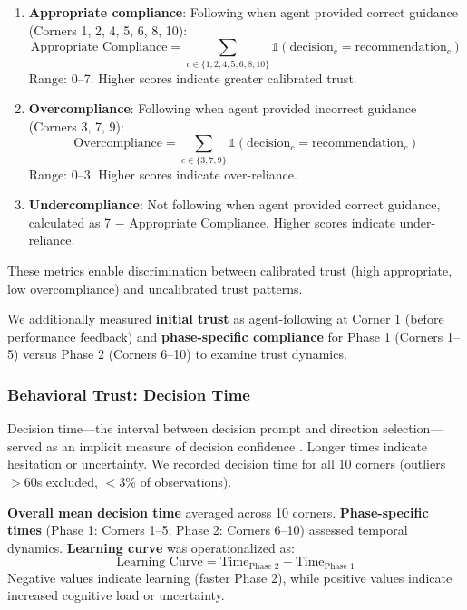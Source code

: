 \documentclass[12pt]{article}
\begin{document}
\begin{enumerate}
\item \textbf{Appropriate compliance}: Following when agent provided correct guidance (Corners 1, 2, 4, 5, 6, 8, 10):
\begin{equation}
\text{Appropriate Compliance} = \sum_{c \in \{1,2,4,5,6,8,10\}} \mathbb{1}(\text{decision}_c = \text{recommendation}_c)
\end{equation}
Range: 0--7. Higher scores indicate greater calibrated trust.

\item \textbf{Overcompliance}: Following when agent provided incorrect guidance (Corners 3, 7, 9):
\begin{equation}
\text{Overcompliance} = \sum_{c \in \{3,7,9\}} \mathbb{1}(\text{decision}_c = \text{recommendation}_c)
\end{equation}
Range: 0--3. Higher scores indicate over-reliance.

\item \textbf{Undercompliance}: Not following when agent provided correct guidance, calculated as 7 $-$ Appropriate Compliance. Higher scores indicate under-reliance.
\end{enumerate}

These metrics enable discrimination between calibrated trust (high appropriate, low overcompliance) and uncalibrated trust patterns.

We additionally measured \textbf{initial trust} as agent-following at Corner 1 (before performance feedback) and \textbf{phase-specific compliance} for Phase 1 (Corners 1--5) versus Phase 2 (Corners 6--10) to examine trust dynamics.

\subsubsection{Behavioral Trust: Decision Time}

Decision time---the interval between decision prompt and direction selection---served as an implicit measure of decision confidence \citep{kiani2014choice}. Longer times indicate hesitation or uncertainty. We recorded decision time for all 10 corners (outliers $>$60s excluded, $<$3\% of observations).

\textbf{Overall mean decision time} averaged across 10 corners. \textbf{Phase-specific times} (Phase 1: Corners 1--5; Phase 2: Corners 6--10) assessed temporal dynamics. \textbf{Learning curve} was operationalized as:
\begin{equation}
\text{Learning Curve} = \text{Time}_{\text{Phase 2}} - \text{Time}_{\text{Phase 1}}
\end{equation}
Negative values indicate learning (faster Phase 2), while positive values indicate increased cognitive load or uncertainty.
\end{document}
